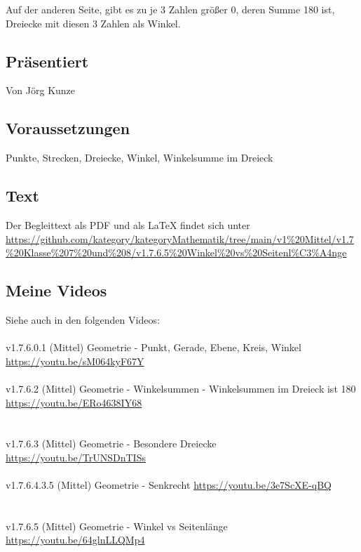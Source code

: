 \documentclass[a4paper]{amsart}
\theoremstyle{definition}
\begin{document}
Auf der anderen Seite, gibt es zu je 3 Zahlen größer 0, deren Summe 180 ist, Dreiecke mit diesen 3 Zahlen als Winkel.

\subsection*{Präsentiert}
Von Jörg Kunze

\subsection*{Voraussetzungen}
Punkte, Strecken, Dreiecke, Winkel, Winkelsumme im Dreieck

\subsection*{Text}
Der Begleittext als PDF und als LaTeX findet sich unter
{\tiny
   \url{https://github.com/kategory/kategoryMathematik/tree/main/v1%20Mittel/v1.7%20Klasse%207%20und%208/v1.7.6.5%20Winkel%20vs%20Seitenl%C3%A4nge}
}

\subsection*{Meine Videos}
Siehe auch in den folgenden Videos:\\
\\
v1.7.6.0.1 (Mittel) Geometrie - Punkt, Gerade, Ebene, Kreis, Winkel\\
\url{https://youtu.be/sM064kyF67Y}\\
\\
v1.7.6.2 (Mittel) Geometrie - Winkelsummen - Winkelsummen im Dreieck ist 180\\
\url{https://youtu.be/ERo4638IY68}\\
\\
\\v1.7.6.3 (Mittel) Geometrie - Besondere Dreiecke
\url{https://youtu.be/TrUNSDnTISs}
\\
\\v1.7.6.4.3.5 (Mittel) Geometrie - Senkrecht
\url{https://youtu.be/3e7ScXE-qBQ}\\
\\
\\v1.7.6.5 (Mittel) Geometrie - Winkel vs Seitenlänge
\url{https://youtu.be/64glnLLQMp4}
\end{document}
